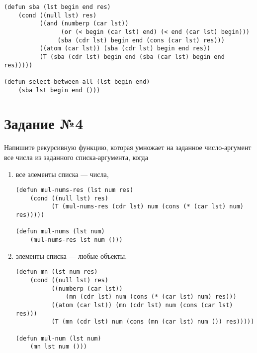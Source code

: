\vspace{4mm}
\begin{minipage}{0.92\linewidth}
\begin{lstlisting}
(defun sba (lst begin end res)
    (cond ((null lst) res)
          ((and (numberp (car lst))
                (or (< begin (car lst) end) (< end (car lst) begin)))
               (sba (cdr lst) begin end (cons (car lst) res)))
          ((atom (car lst)) (sba (cdr lst) begin end res))
          (T (sba (cdr lst) begin end (sba (car lst) begin end res)))))

(defun select-between-all (lst begin end)
    (sba lst begin end ()))
\end{lstlisting}
\end{minipage}

\section{Задание №4}

Напишите рекурсивную функцию, которая умножает на заданное
число-аргумент все числа из заданного списка-аргумента, когда 

\begin{enumerate}
    \item все элементы списка --- числа,

\vspace{4mm}
\begin{minipage}{0.92\linewidth}
\begin{lstlisting}
(defun mul-nums-res (lst num res)
    (cond ((null lst) res)
          (T (mul-nums-res (cdr lst) num (cons (* (car lst) num) res)))))

(defun mul-nums (lst num)
    (mul-nums-res lst num ()))
\end{lstlisting}
\end{minipage}

    \item элементы списка --- любые объекты.

\vspace{4mm}
\begin{minipage}{0.92\linewidth}
\begin{lstlisting}
(defun mn (lst num res)
    (cond ((null lst) res)
          ((numberp (car lst))
              (mn (cdr lst) num (cons (* (car lst) num) res)))
          ((atom (car lst)) (mn (cdr lst) num (cons (car lst) res)))
          (T (mn (cdr lst) num (cons (mn (car lst) num ()) res)))))

(defun mul-num (lst num)
    (mn lst num ()))
\end{lstlisting}
\end{minipage}

\end{enumerate}

